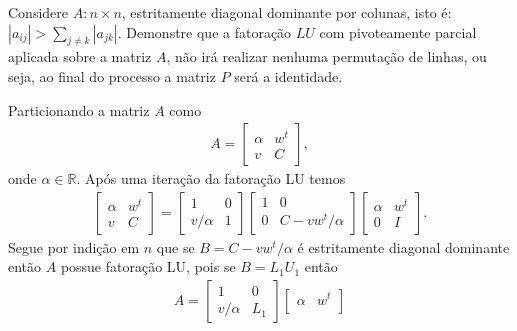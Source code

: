 \documentclass[a4paper,12pt, leqno, answers]{exam}
\begin{document}
\begin{questions}
     Considere $A : n \times n$, estritamente diagonal dominante por colunas, isto \'{e}: $| a_{ij} | > \sum_{j \neq k} | a_{jk} |$. Demonstre que a fatora\c{c}\~{a}o $LU$ com pivoteamente parcial aplicada sobre a matriz $A$, n\~{a}o ir\'{a} realizar nenhuma permuta\c{c}\~{a}o de linhas, ou seja, ao final do processo a matriz $P$ ser\'{a} a identidade.
    \begin{solution}
        Particionando a matriz $A$ como
        \begin{align*}
            A = \begin{bmatrix}
                \alpha & w^t \\
                v & C
            \end{bmatrix},
        \end{align*}
        onde $\alpha \in \mathbb{R}$. Ap\'{o}s uma itera\c{c}\~{a}o da fatora\c{c}\~{a}o LU temos
        \begin{align*}
            \begin{bmatrix}
                \alpha & w^t \\
                v & C
            \end{bmatrix} = \begin{bmatrix}
                1 & 0 \\
                v / \alpha & 1
            \end{bmatrix} \begin{bmatrix}
                1 & 0 \\
                0 & C - v w^t / \alpha
            \end{bmatrix} \begin{bmatrix}
                \alpha & w^t \\
                0 & I
            \end{bmatrix}.
        \end{align*}
        Segue por indi\c{c}\~{a}o em $n$ que se $B = C - v w^t / \alpha$ \'{e} estritamente diagonal dominante ent\~{a}o $A$ possue fatora\c{c}\~{a}o LU, pois se $B = L_1 U_1$ ent\~{a}o
        \begin{align*}
            A = \begin{bmatrix}
                1 & 0 \\
                v / \alpha & L_1
            \end{bmatrix} \begin{bmatrix}
                \alpha & w^t \\

\end{bmatrix}
\end{align*}
\end{solution}
\end{questions}
\end{document}

